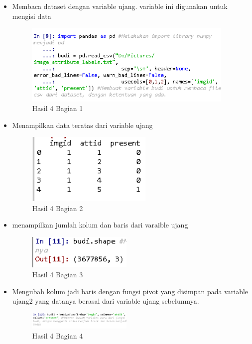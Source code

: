 \begin{itemize}
\item Membaca dataset dengan variable ujang. variable ini digunakan untuk mengisi data

\begin{figure}[H]
\centerline{\includegraphics[width=10cm]{figures/1174079/3/praktek3.PNG}}
\caption{Hasil 4 Bagian 1}
\label{labelgambar}
\end{figure}

\item Menampilkan data teratas dari variable ujang

\begin{figure}[H]
\centerline{\includegraphics[width=6cm]{figures/1174079/3/praktek4.PNG}}
\caption{Hasil 4 Bagian 2}
\label{labelgambar}
\end{figure}

\item menampilkan jumlah kolum dan baris dari varaible ujang

\begin{figure}[H]
\centerline{\includegraphics[width=5cm]{figures/1174079/3/praktek5.PNG}}
\caption{Hasil 4 Bagian 3}
\label{labelgambar}
\end{figure}

\item Mengubah kolum jadi baris dengan fungsi pivot yang disimpan pada variable ujang2 yang datanya berasal dari variable ujang sebelumnya.

\begin{figure}[H]
\centerline{\includegraphics[width=5cm]{figures/1174079/3/praktek6.PNG}}
\caption{Hasil 4 Bagian 4}
\label{labelgambar}
\end{figure}


\end{itemize}
